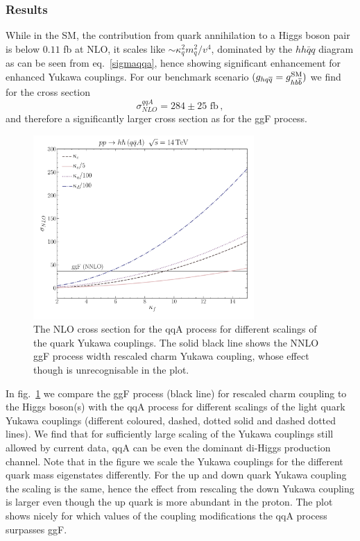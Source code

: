 \subsubsection{Results}
While in the SM, the contribution from quark annihilation to a Higgs boson pair is below $0.11$ fb at NLO, it scales like $ \sim \kappa_q^2 m_q^2/v^4$, dominated by the $hh \bar q q$ diagram as can be seen from eq.~\eqref{sigmaqqa}, hence showing significant enhancement for enhanced Yukawa couplings.
For our benchmark scenario $(g_{hq \overline q} = g_{h b \overline b}^{\mathrm{SM}})$ we find for the cross section
\begin{equation}
	\sigma^{qqA}_{NLO}= 284 \pm 25 \text{ fb}\,,
\end{equation}
and therefore a significantly larger cross section as for the ggF process.
\begin{figure}[!t]
	\centering
	\includegraphics[width = 0.75\textwidth]{./fig/xs_qqa_kf}
	\caption{The NLO cross section for the qqA process for different scalings of the quark Yukawa couplings. The solid black line shows the NNLO ggF process width rescaled charm Yukawa coupling, whose effect though is unrecognisable in the plot. }
	\label{qqA_ggF}
\end{figure}
In fig.~\ref{qqA_ggF} we compare the ggF process (black line) for rescaled charm coupling to the Higgs boson(s) with the qqA process for different scalings of the light quark Yukawa couplings  (different coloured, dashed, dotted solid and dashed dotted lines).
We find that for sufficiently large scaling of the Yukawa couplings still allowed by current data, qqA can be even  the dominant di-Higgs production channel. Note that in the figure we scale the Yukawa couplings for the different quark mass eigenstates differently. For the up and down quark Yukawa coupling the scaling is the same, hence the effect from rescaling the down Yukawa coupling is larger even though the up quark is more abundant in the proton. The plot shows nicely for which values of the coupling modifications the qqA process surpasses ggF. \\
